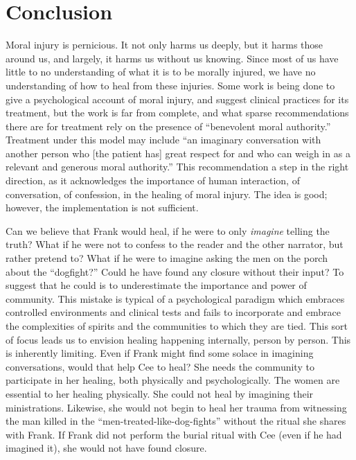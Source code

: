 \documentclass[12pt]{article}
\begin{document}
\section{Conclusion}

Moral injury is pernicious. It not only harms us deeply, but it harms those
around us, and largely, it harms us without us knowing. Since most of us have
little to no understanding of what it is to be morally injured, we have no
understanding of how to heal from these injuries. Some work is being done to
give a psychological account of moral injury, and suggest clinical practices
for its treatment,\autocite{Litz09} but the work is far from complete, and what
sparse recommendations there are for treatment rely on the presence of
``benevolent moral authority.''\autocite[\S 7.2]{Litz09} Treatment under this
model may include ``an imaginary conversation with another person who [the
patient has] great respect for and who can weigh in as a relevant and generous
moral authority.''\autocite[\S 7.2.5]{Litz09} This recommendation a step in the
right direction, as it acknowledges the importance of human interaction, of
conversation, of confession, in the healing of moral injury. The idea is good;
however, the implementation is not sufficient.

Can we believe that Frank would heal, if he were to only \emph{imagine} telling
the truth? What if he were not to confess to the reader and the other narrator,
but rather pretend to? What if he were to imagine asking the men on the porch
about the ``dogfight?'' Could he have found any closure without their input?
To suggest that he could is to underestimate the importance and power of
community.  This mistake is typical of a psychological paradigm which embraces
controlled environments and clinical tests and fails to incorporate and embrace
the complexities of spirits and the communities to which they are tied.  This
sort of focus leads us to envision healing happening internally, person by
person. This is inherently limiting. Even if Frank might find some solace in
imagining conversations, would that help Cee to heal? She needs the community
to participate in her healing, both physically and psychologically. The women
are essential to her healing physically. She could not heal by imagining their
ministrations. Likewise, she would not begin to heal her trauma from witnessing
the man killed in the ``men-treated-like-dog-fights''\autocite[137]{Morrison12}
without the ritual she shares with Frank. If Frank did not perform the burial
ritual with Cee (even if he had imagined it), she would not have found closure.
\end{document}
